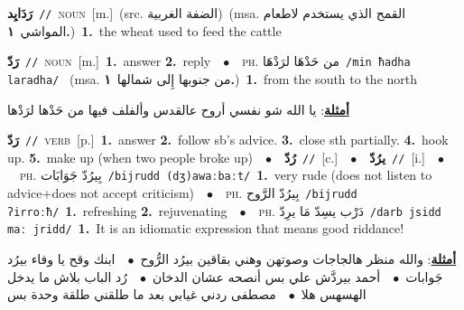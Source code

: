 \documentclass[10pt,a4paper,twoside]{article} %
\begin{document}
\begin{multicols}{2}
{\setlength\topsep{0pt}\textbf{\foreignlanguage{arabic}{رَدَايِد}}\ {\color{gray}\texttt{//}\color{black}}\ \textsc{noun}\ [m.]\ (src. \color{gray}\foreignlanguage{arabic}{الضفة الغربية}\color{black})\ \color{gray}(msa. \foreignlanguage{arabic}{القمح الذي يستخدم لاطعام المواشي}~\foreignlanguage{arabic}{\textbf{١.}})\color{black}\ \textbf{1.}~the wheat used to feed the cattle\ } \vspace{2mm}

{\setlength\topsep{0pt}\textbf{\foreignlanguage{arabic}{رَدّ}}\ {\color{gray}\texttt{//}\color{black}}\ \textsc{noun}\ [m.]\ \textbf{1.}~answer  \textbf{2.}~reply\ \ $\bullet$\ \ \textsc{ph.} \color{gray} \foreignlanguage{arabic}{من حَدْهَا لرَدْهَا}\color{black}\ {\color{gray}\texttt{/{\sffamily min ħadha laradha}/}\color{black}}\ \color{gray} (msa. \foreignlanguage{arabic}{من جنوبها إِلى شمالها}~\foreignlanguage{arabic}{\textbf{١.}})\color{black}\ \textbf{1.}~from the south to the north\  \begin{flushright}\color{gray}\foreignlanguage{arabic}{\textbf{\underline{\foreignlanguage{arabic}{أمثلة}}}: يا الله شو نفسي أروح عالقدس وألفلف فيها من حَدْها لرَدْها}\end{flushright}\color{black}} \vspace{2mm}

{\setlength\topsep{0pt}\textbf{\foreignlanguage{arabic}{رَدّ}}\ {\color{gray}\texttt{//}\color{black}}\ \textsc{verb}\ [p.]\ \textbf{1.}~answer  \textbf{2.}~follow sb's advice.  \textbf{3.}~close sth partially.  \textbf{4.}~hook up.  \textbf{5.}~make up (when two people broke up)\ \ $\bullet$\ \ \setlength\topsep{0pt}\textbf{\foreignlanguage{arabic}{رُدّ}}\ {\color{gray}\texttt{//}\color{black}}\ [c.]\ \ $\bullet$\ \ \setlength\topsep{0pt}\textbf{\foreignlanguage{arabic}{يرُدّ}}\ {\color{gray}\texttt{//}\color{black}}\ [i.]\ \ $\bullet$\ \ \textsc{ph.} \color{gray} \foreignlanguage{arabic}{بِيرُدّ جَوَابَات}\color{black}\ {\color{gray}\texttt{/{\sffamily bijrudd (dʒ)awaːbaːt}/}\color{black}}\ \textbf{1.}~very rude (does not listen to advice+does not accept criticism)\ \ $\bullet$\ \ \textsc{ph.} \color{gray} \foreignlanguage{arabic}{بِيرُدّ الرَّوح}\color{black}\ {\color{gray}\texttt{/{\sffamily bijrudd ʔirroːħ}/}\color{black}}\ \textbf{1.}~refreshing  \textbf{2.}~rejuvenating\ \ $\bullet$\ \ \textsc{ph.} \color{gray} \foreignlanguage{arabic}{دَرْب يسِدّ مَا يرِدّ}\color{black}\ {\color{gray}\texttt{/{\sffamily darb jsidd maː jridd}/}\color{black}}\ \textbf{1.}~It is an idiomatic expression that means good riddance!\  \begin{flushright}\color{gray}\foreignlanguage{arabic}{\textbf{\underline{\foreignlanguage{arabic}{أمثلة}}}: والله منظر هالجاجات وصوتهن وهني بقاقين بيرُد الرُّوح\ $\bullet$\ \  ابنك وقح يا وفاء بيرُد جَوابات\ $\bullet$\ \  أحمد بيردَّش علي بس أنصحه عشان الدخان\ $\bullet$\ \  رُد الباب بلاش ما يدخل الهسهس هلا\ $\bullet$\ \  مصطفى ردني غيابي بعد ما طلقني طلقة وحدة بس}\end{flushright}\color{black}} \vspace{2mm}


\end{multicols}
\end{document}

